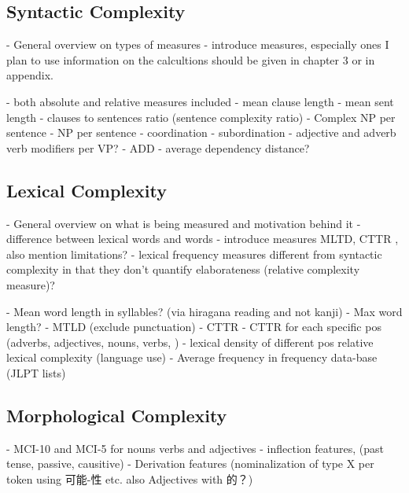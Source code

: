 
\subsection{Syntactic Complexity}
- General overview on types of measures
- introduce measures, especially ones I plan to use information on the calcultions should be given in chapter 3 or
in appendix.

- both absolute and relative measures included
    - mean clause length
    - mean sent length
    - clauses to sentences ratio (sentence complexity ratio)
    - Complex NP per sentence
    - NP per sentence
    - coordination
    - subordination
    - adjective and adverb verb modifiers per VP?
    - ADD - average dependency distance?



\subsection{Lexical Complexity}
- General overview on what is being measured and motivation behind it
    -difference between lexical words and words
- introduce measures MLTD, CTTR , also mention limitations?
- lexical frequency measures different from syntactic complexity in that they don't quantify elaborateness (relative
complexity measure)?

    - Mean word length in syllables? (via hiragana reading and not kanji)
    - Max word length?
    - MTLD (exclude punctuation)
    - CTTR
    - CTTR for each specific pos (adverbs, adjectives, nouns, verbs, )
    - lexical density of different pos
relative lexical complexity (language use)
    - Average frequency in frequency data-base (JLPT lists)

\subsection{Morphological Complexity}
    - MCI-10 and MCI-5 for nouns verbs and adjectives
    - inflection features, (past tense, passive, causitive)
    - Derivation features (nominalization of type X per token using 可能-性 etc. also Adjectives with 的？)

